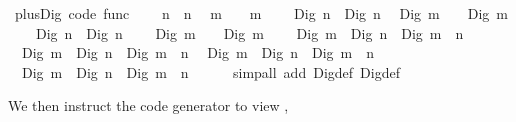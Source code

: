 \begin{isabellebody}
\begin{isamarkuptext}
\end{isamarkuptext}%
\isamarkuptrue%
%
\isadelimquoteme
%
\endisadelimquoteme
%
\isatagquoteme
{}\isamarkupfalse%
\ plus{\isacharunderscore}Dig\ {\isacharbrackleft}code\ func{\isacharbrackright}{\isacharcolon}\isanewline
\ \ {\isachardoublequoteopen}{}\ {\isacharplus}\ n\ {\isacharequal}\ n{\isachardoublequoteclose}\isanewline
\ \ {\isachardoublequoteopen}m\ {\isacharplus}\ {}\ {\isacharequal}\ m{\isachardoublequoteclose}\isanewline
\ \ {\isachardoublequoteopen}{}\ {\isacharplus}\ Dig{}\ n\ {\isacharequal}\ Dig{}\ n{\isachardoublequoteclose}\isanewline
\ \ {\isachardoublequoteopen}Dig{}\ m\ {\isacharplus}\ {}\ {\isacharequal}\ Dig{}\ m{\isachardoublequoteclose}\isanewline
\ \ {\isachardoublequoteopen}{}\ {\isacharplus}\ Dig{}\ n\ {\isacharequal}\ Dig{}\ {\isacharparenleft}n\ {\isacharplus}\ {}{\isacharparenright}{\isachardoublequoteclose}\isanewline
\ \ {\isachardoublequoteopen}Dig{}\ m\ {\isacharplus}\ {}\ {\isacharequal}\ Dig{}\ {\isacharparenleft}m\ {\isacharplus}\ {}{\isacharparenright}{\isachardoublequoteclose}\isanewline
\ \ {\isachardoublequoteopen}Dig{}\ m\ {\isacharplus}\ Dig{}\ n\ {\isacharequal}\ Dig{}\ {\isacharparenleft}m\ {\isacharplus}\ n{\isacharparenright}{\isachardoublequoteclose}\isanewline
\ \ {\isachardoublequoteopen}Dig{}\ m\ {\isacharplus}\ Dig{}\ n\ {\isacharequal}\ Dig{}\ {\isacharparenleft}m\ {\isacharplus}\ n{\isacharparenright}{\isachardoublequoteclose}\isanewline
\ \ {\isachardoublequoteopen}Dig{}\ m\ {\isacharplus}\ Dig{}\ n\ {\isacharequal}\ Dig{}\ {\isacharparenleft}m\ {\isacharplus}\ n{\isacharparenright}{\isachardoublequoteclose}\isanewline
\ \ {\isachardoublequoteopen}Dig{}\ m\ {\isacharplus}\ Dig{}\ n\ {\isacharequal}\ Dig{}\ {\isacharparenleft}m\ {\isacharplus}\ n\ {\isacharplus}\ {}{\isacharparenright}{\isachardoublequoteclose}\isanewline
\ \ \isamarkupfalse%
\ {\isacharparenleft}simp{\isacharunderscore}all\ add{\isacharcolon}\ Dig{}{\isacharunderscore}def\ Dig{}{\isacharunderscore}def{\isacharparenright}%
\endisatagquoteme
{\isafoldquoteme}%
%
\isadelimquoteme
%
\endisadelimquoteme
%
\begin{isamarkuptext}%
\noindent We then instruct the code generator to view ,

\end{isamarkuptext}
\end{isabellebody}

